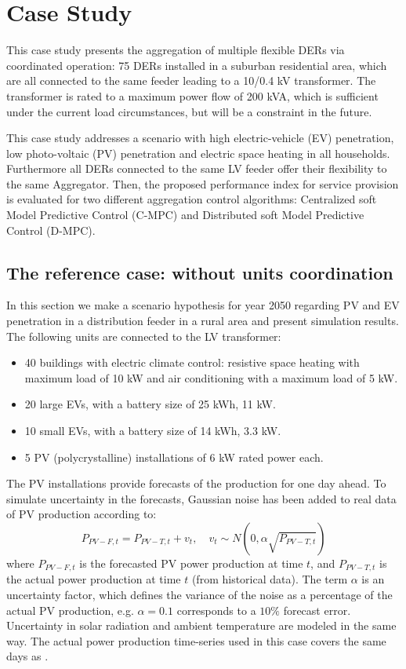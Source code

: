 \section{Case Study}
\label{sec:case}
This case study presents the aggregation of multiple flexible DERs via coordinated operation: 75 DERs installed in a suburban residential area, which are all connected to the same feeder leading to a 10/0.4 kV transformer. The transformer is rated to a maximum power flow of 200 kVA, which is sufficient under the current load circumstances, but will be a constraint in the future.

This case study addresses a scenario with high electric-vehicle (EV) penetration, low photo-voltaic (PV) penetration and electric space heating in all households. Furthermore all DERs connected to the same LV feeder offer their flexibility to the same Aggregator. Then, the proposed performance index for service provision is evaluated for two different aggregation control algorithms: Centralized soft Model Predictive Control (C-MPC) and Distributed soft Model Predictive Control (D-MPC).

\subsection{The reference case: without units coordination}
In this section we make a scenario hypothesis for year 2050 regarding PV and EV penetration in a distribution feeder in a rural area and present simulation results. The following units are connected to the LV transformer:
\begin{itemize}
\item 40 buildings with electric climate control: resistive space heating with maximum load of 10 kW and air conditioning with a maximum load of 5 kW.
\item 20 large EVs, with a battery size of 25 kWh, 11 kW.
\item 10 small EVs, with a battery size of 14 kWh, 3.3 kW.
\item 5 PV (polycrystalline) installations of 6 kW rated power each.
\end{itemize} 

The PV installations provide forecasts of the production for one day ahead. To simulate uncertainty in the forecasts, Gaussian noise has been added to real data of PV production according to:
\begin{equation}
	{P_{PV-F,t}} = {P_{PV-T,t}} + {v_t},\quad {v_t} \sim N\left( {0,\alpha  \sqrt {{P_{PV-T,t}}} } \right)\label{eq:pvprod}
\end{equation}
where $P_{PV-F,t}$ is the forecasted PV power production at time $t$, and $P_{PV-T,t}$ is the actual power production at time $t$ (from historical data). The term $\alpha$ is an uncertainty factor, which defines the variance of the noise as a percentage of the actual PV production, e.g. $\alpha = 0.1$ corresponds to a $10\%$ forecast error. Uncertainty in solar radiation and ambient temperature are modeled in the same way. The actual power production time-series used in this case covers the same days as \cite{Costanzo}.


